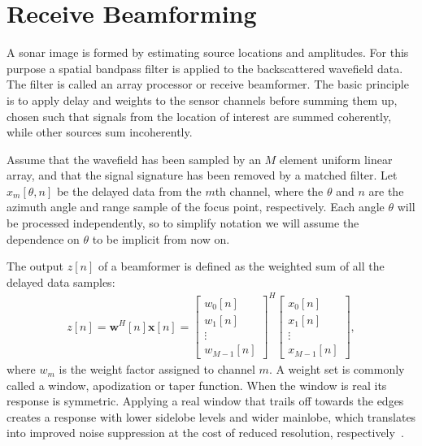 \documentclass[10pt,journal,draftclsnofoot,onecolumn]{IEEEtran}
\newcommand\bmat[1]{\begin{bmatrix}#1\end{bmatrix}}
\renewcommand\H{^{\scriptscriptstyle H}}
\renewcommand\vec[1]{\boldsymbol{#1}}
\newcommand\1{\vec 1}
\newcommand*\w{\vec w}
\newcommand*\x{\vec x}
\begin{document}
% 
% 


\section{Receive Beamforming}\label{sec:beamforming}

A sonar image is formed by estimating source locations and amplitudes. For this purpose a spatial bandpass filter is applied to the backscattered wavefield data. The filter is called an array processor or receive beamformer. The basic principle is to apply delay and weights to the sensor channels before summing them up, chosen such that signals from the location of interest are summed coherently, while other sources sum incoherently.

Assume that the wavefield has been sampled by an $M$ element uniform linear array, and that the signal signature has been removed by a matched filter. Let $x_m[\theta,n]$ be the delayed data from the $m$th channel, where the $\theta$ and $n$ are the azimuth angle and range sample of the focus point, respectively. Each angle $\theta$ will be processed independently, so to simplify notation we will assume the dependence on $\theta$ to be implicit from now on. 

The output $z[n]$ of a beamformer is defined as the weighted sum of all the delayed data samples:
%
\begin{align}
z[n] = \w\H[n]\x[n] = \bmat{w_0[n]\\w_1[n]\\\vdots\\w_{M-1}[n]}^H \bmat{x_0[n]\\x_1[n]\\\vdots\\x_{M-1}[n]},\label{eq:beamformer_output}
\end{align}
%
where $w_m$ is the weight factor assigned to channel $m$. A weight set is commonly called a window, apodization or taper function. When the window is real its response is symmetric. Applying a real window that trails off towards the edges creates a response with lower sidelobe levels and wider mainlobe, which translates into improved noise suppression at the cost of reduced resolution, respectively~\cite{Harris1978}.
\end{document}

